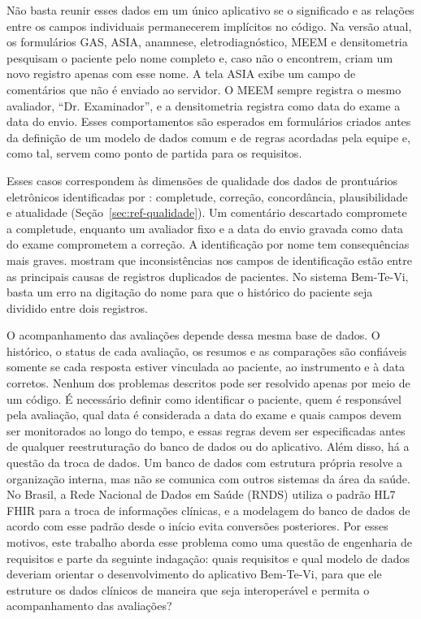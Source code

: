 Não basta reunir esses dados em um único aplicativo se o significado e
as relações entre os campos individuais permanecerem implícitos no código. Na versão atual, os formulários GAS,
ASIA, anamnese, eletrodiagnóstico, MEEM e densitometria pesquisam o paciente pelo
nome completo e, caso não o encontrem, criam um novo registro apenas com esse nome. A tela ASIA exibe um campo de comentários que não é enviado ao servidor. O MEEM
sempre registra o mesmo avaliador, “Dr. Examinador”, e a densitometria registra como data
do exame a data do envio. Esses comportamentos são esperados em formulários criados
antes da definição de um modelo de dados comum e de regras acordadas pela equipe e,
como tal, servem como ponto de partida para os requisitos.
  
Esses casos correspondem às dimensões de qualidade dos dados de prontuários eletrônicos identificadas por
: completude, correção, concordância, plausibilidade e atualidade
(Seção~\ref{sec:ref-qualidade}).
Um comentário descartado compromete a completude, enquanto um avaliador fixo e a data do envio gravada como data do exame comprometem a correção.
A identificação por nome tem consequências mais graves.  mostram que inconsistências nos
campos de identificação estão entre as principais causas de registros duplicados de pacientes. No sistema Bem-Te-Vi, basta um erro na digitação
do nome para que o histórico do paciente seja dividido entre dois registros.

O acompanhamento das avaliações depende dessa mesma base de dados. O histórico, o status de cada avaliação, os resumos e as comparações são
confiáveis somente se cada resposta estiver vinculada ao paciente, ao instrumento e à data corretos. Nenhum dos problemas descritos
pode ser resolvido apenas por meio de um código. É necessário definir como identificar o paciente, quem é responsável pela avaliação,
qual data é considerada a data do exame e quais campos devem ser monitorados ao longo do tempo, e essas regras devem
ser especificadas antes de qualquer reestruturação do banco de dados ou do aplicativo. Além disso, há a questão da troca de dados.
Um banco de dados com estrutura própria resolve a organização interna, mas não se comunica com outros sistemas da área da saúde. No
Brasil, a Rede Nacional de Dados em Saúde (RNDS) utiliza o padrão HL7 FHIR para a troca de informações clínicas,
e a modelagem do banco de dados de acordo com esse padrão desde o início evita conversões posteriores. Por esses motivos, este trabalho
aborda esse problema como uma questão de engenharia de requisitos e parte da seguinte indagação: quais requisitos e qual
modelo de dados deveriam orientar o desenvolvimento do aplicativo Bem-Te-Vi, para que ele estruture os dados clínicos de maneira que seja
interoperável e permita o acompanhamento das avaliações?


